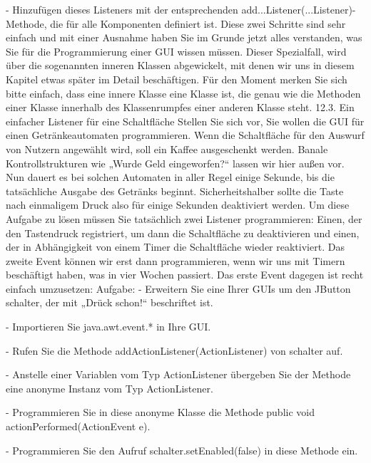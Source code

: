 -	Hinzufügen dieses Listeners mit der entsprechenden add...Listener(...Listener)-Methode, die für alle Komponenten definiert ist.
Diese zwei Schritte sind sehr einfach und mit einer Ausnahme haben Sie im Grunde jetzt alles verstanden, was Sie für die Programmierung einer GUI wissen müssen. Dieser Spezialfall, wird über die sogenannten inneren Klassen abgewickelt, mit denen wir uns in diesem Kapitel etwas später im Detail beschäftigen. Für den Moment merken Sie sich bitte einfach, dass eine innere Klasse eine Klasse ist, die genau wie die Methoden einer Klasse innerhalb des Klassenrumpfes einer anderen Klasse steht.
12.3.	Ein einfacher Listener für eine Schaltfläche
Stellen Sie sich vor, Sie wollen die GUI für einen Getränkeautomaten programmieren. Wenn die Schaltfläche für den Auswurf von Nutzern angewählt wird, soll ein Kaffee ausgeschenkt werden. Banale Kontrollstrukturen wie „Wurde Geld eingeworfen?“ lassen wir hier außen vor. Nun dauert es bei solchen Automaten in aller Regel einige Sekunde, bis die tatsächliche Ausgabe des Getränks beginnt. Sicherheitshalber sollte die Taste nach einmaligem Druck also für einige Sekunden deaktiviert werden.
Um diese Aufgabe zu lösen müssen Sie tatsächlich zwei Listener programmieren: Einen, der den Tastendruck registriert, um dann die Schaltfläche zu deaktivieren und einen, der in Abhängigkeit von einem Timer die Schaltfläche wieder reaktiviert.
Das zweite Event können wir erst dann programmieren, wenn wir uns mit Timern beschäftigt haben, was in vier Wochen passiert. Das erste Event dagegen ist recht einfach umzusetzen:
Aufgabe:
-	Erweitern Sie eine Ihrer GUIs um den JButton schalter, der mit „Drück schon!“ beschriftet ist.

-	Importieren Sie java.awt.event.* in Ihre GUI.

-	Rufen Sie die Methode addActionListener(ActionListener) von schalter auf.

-	Anstelle einer Variablen vom Typ ActionListener übergeben Sie der Methode eine anonyme Instanz vom Typ ActionListener.

-	Programmieren Sie in diese anonyme Klasse die Methode public void actionPerformed(ActionEvent e).

-	Programmieren Sie den Aufruf schalter.setEnabled(false) in diese Methode ein. 

